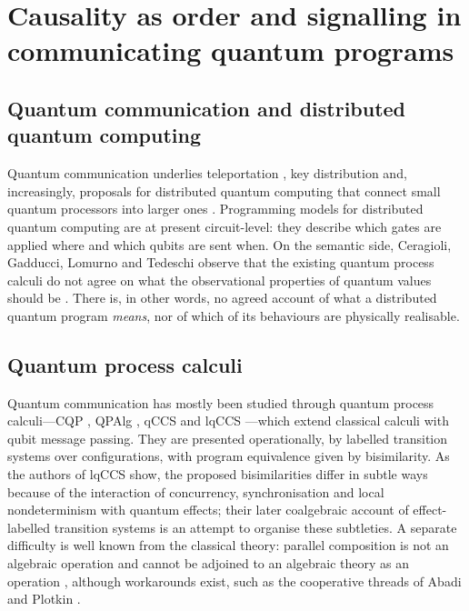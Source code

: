 \section{Causality as order and signalling in communicating quantum programs}\label{sec:order}

\subsection{Quantum communication and distributed quantum computing}

Quantum communication underlies teleportation \cite{Teleportation_PhysRevLett.70.1895}, key distribution \cite{BB84_BENNETT20147} and, increasingly, proposals for distributed quantum computing that connect small quantum processors into larger ones \cite{DQC_survey_Caleffi_2024}. Programming models for distributed quantum computing are at present circuit-level: they describe which gates are applied where and which qubits are sent when. On the semantic side, Ceragioli, Gadducci, Lomurno and Tedeschi observe that the existing quantum process calculi do not agree on what the observational properties of quantum values should be \cite{lqCCS_10.1145/3632885}. There is, in other words, no agreed account of what a distributed quantum program \emph{means}, nor of which of its behaviours are physically realisable.

\subsection{Quantum process calculi}

Quantum communication has mostly been studied through quantum process calculi---CQP \cite{CQP_gay2004communicatingquantumprocesses}, QPAlg \cite{QPAlg_lalire2004processalgebraicapproachconcurrent}, qCCS \cite{qCCS_ying2010algebraquantumprocesses} and lqCCS \cite{lqCCS_10.1145/3632885}---which extend classical calculi \cite{ccs_10.5555/539036,CSP_10.1145/359576.359585,pi_calc_MILNER19921} with qubit message passing. They are presented operationally, by labelled transition systems over configurations, with program equivalence given by bisimilarity. As the authors of lqCCS show, the proposed bisimilarities differ in subtle ways because of the interaction of concurrency, synchronisation and local nondeterminism with quantum effects; their later coalgebraic account of effect-labelled transition systems \cite{ceragiolicoalgebraic} is an attempt to organise these subtleties. A separate difficulty is well known from the classical theory: parallel composition is not an algebraic operation and cannot be adjoined to an algebraic theory as an operation \cite{stark:freamp,CSP_van_Glabbeek_2010}, although workarounds exist, such as the cooperative threads of Abadi and Plotkin \cite{Cooperative_Threads_DBLP:journals/corr/abs-1009-2405}.

